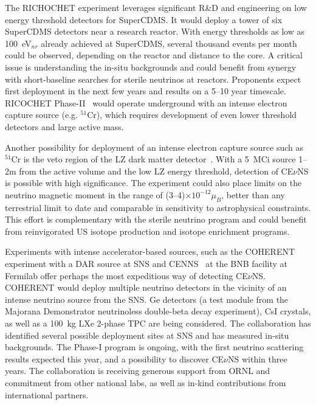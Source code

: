 The RICHOCHET experiment leverages significant R\&D and engineering on
low energy threshold detectors for SuperCDMS. It would deploy a tower
of six SuperCDMS detectors near a research reactor. With energy
thresholds as low as 100~eV$_{nr}$ already achieved at SuperCDMS,
several thousand events per month could be observed, depending on the
reactor and distance to the core. A critical issue is understanding
the in-situ backgrounds and could benefit from synergy with
short-baseline searches for sterile neutrinos at reactors.  Proponents
expect first deployment in the next few years and results on a 5--10
year timescale.  RICOCHET Phase-II~\cite{Formaggio:2011jt} would
operate underground with an intense electron capture source
(e.g. $^{51}$Cr), which requires development of even lower threshold
detectors and large active mass.

Another possibility for deployment of an intense electron capture
source such as $^{51}$Cr is the veto region of the LZ dark matter
detector~\cite{Coloma:2014hka}. With a 5~MCi source 1--2m from the
active volume and the low LZ energy threshold, detection
of CE$\nu$NS is possible with high significance. The experiment could
also place limits on the neutrino magnetic moment in the range
of (3--4)$\times10^{-12}\mu_B$, better than any terrestrial limit to
date and comparable in sensitivity to astrophysical constraints. This
effort is complementary with the sterile neutrino program and
could benefit from reinvigorated US isotope production and
isotope enrichment programs.


Experiments with intense accelerator-based sources, such as the
COHERENT~\cite{Akimov:2013yow} experiment with a DAR source at SNS and
CENNS~\cite{Brice:2013fwa} at the BNB facility at Fermilab offer
perhaps the most expeditious way of detecting CE$\nu$NS. COHERENT
would deploy multiple neutrino detectors in the vicinity of an intense
neutrino source from the SNS. Ge detectors (a test module from
the {\sc Majorana Demonstrator\/} neutrinoless double-beta decay
experiment), CsI crystals, as well as a 100~kg LXe 2-phase TPC are
being considered. The collaboration has identified several possible
deployment sites at SNS and has measured in-situ backgrounds.  The
Phase-I program is  ongoing, with the first neutrino scattering
results expected this year, and a possibility to discover CE$\nu$NS
within three years. The collaboration is receiving generous support
from ORNL and commitment from other national labs, as well as in-kind
contributions from international partners. 


